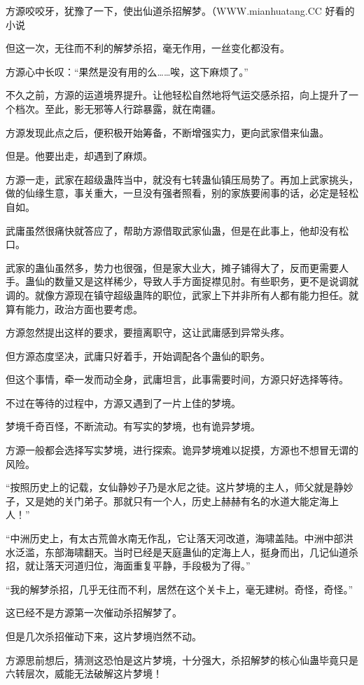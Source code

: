 \begin{this_body}
方源咬咬牙，犹豫了一下，使出仙道杀招解梦。（WWW.mianhuatang.CC 好看的小说

但这一次，无往而不利的解梦杀招，毫无作用，一丝变化都没有。

方源心中长叹：“果然是没有用的么……唉，这下麻烦了。”

不久之前，方源的运道境界提升。让他轻松自然地将气运交感杀招，向上提升了一个档次。至此，影无邪等人行踪暴露，就在南疆。

方源发现此点之后，便积极开始筹备，不断增强实力，更向武家借来仙蛊。

但是。他要出走，却遇到了麻烦。

方源一走，武家在超级蛊阵当中，就没有七转蛊仙镇压局势了。再加上武家挑头，做的仙缘生意，事关重大，一旦没有强者照看，别的家族要闹事的话，必定是轻松自如。

武庸虽然很痛快就答应了，帮助方源借取武家仙蛊，但是在此事上，他却没有松口。

武家的蛊仙虽然多，势力也很强，但是家大业大，摊子铺得大了，反而更需要人手。蛊仙的数量又是这样稀少，导致人手方面捉襟见肘。有些职务，更不是说调就调的。就像方源现在镇守超级蛊阵的职位，武家上下并非所有人都有能力担任。就算有能力，政治方面也要考虑。

方源忽然提出这样的要求，要擅离职守，这让武庸感到异常头疼。

但方源态度坚决，武庸只好着手，开始调配各个蛊仙的职务。

但这个事情，牵一发而动全身，武庸坦言，此事需要时间，方源只好选择等待。

不过在等待的过程中，方源又遇到了一片上佳的梦境。

梦境千奇百怪，不断流动。有写实的梦境，也有诡异梦境。

方源一般都会选择写实梦境，进行探索。诡异梦境难以捉摸，方源也不想冒无谓的风险。

“按照历史上的记载，女仙静妙子乃是水尼之徒。这片梦境的主人，师父就是静妙子，又是她的关门弟子。那就只有一个人，历史上赫赫有名的水道大能定海上人！”

“中洲历史上，有太古荒兽水南无作乱，它让落天河改道，海啸盖陆。中洲中部洪水泛滥，东部海啸翻天。当时已经是天庭蛊仙的定海上人，挺身而出，几记仙道杀招，就让落天河道归位，海面重复平静，手段极为了得。”

“我的解梦杀招，几乎无往而不利，居然在这个关卡上，毫无建树。奇怪，奇怪。”

这已经不是方源第一次催动杀招解梦了。

但是几次杀招催动下来，这片梦境岿然不动。

方源思前想后，猜测这恐怕是这片梦境，十分强大，杀招解梦的核心仙蛊毕竟只是六转层次，威能无法破解这片梦境！


\end{this_body}
